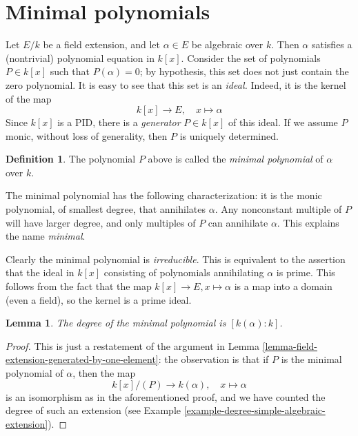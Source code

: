 \documentclass{stacks-project}
\theoremstyle{plain}
\newtheorem{lemma}[subsection]{Lemma}
\theoremstyle{definition}
\newtheorem{definition}[subsection]{Definition}
\theoremstyle{remark}
\numberwithin{equation}{subsection}
\begin{document}
\section{Minimal polynomials}
\label{section-minimal-polynomials}

\noindent
Let $E/k$ be a field extension, and let $\alpha \in E$ be algebraic over $k$.
Then $\alpha$ satisfies a (nontrivial) polynomial equation in $k[x]$.
Consider the set of polynomials $P \in k[x]$ such that $P(\alpha) = 0$; by
hypothesis, this set does not just contain the zero polynomial.
It is easy to see that this set is an {\it ideal.} Indeed, it is the kernel
of the map
$$
k[x] \to E, \quad x \mapsto \alpha
$$
Since $k[x]$ is a PID, there is a {\it generator} $P \in k[x]$ of this
ideal. If we assume $P$ monic, without loss of generality, then $P$ is
uniquely determined.

\begin{definition}
\label{definition-minimal-polynomial}
The polynomial $P$ above is called the {\it minimal polynomial}
of $\alpha$ over $k$.
\end{definition}

\noindent
The minimal polynomial has the following characterization: it is the monic
polynomial, of smallest degree, that annihilates $\alpha$. Any nonconstant
multiple of $P$ will have larger degree, and only multiples of $P$ can
annihilate $\alpha$. This explains the name {\it minimal}.

\medskip\noindent
Clearly the minimal polynomial is {\it irreducible}. This is equivalent to the
assertion that the ideal in $k[x]$ consisting of polynomials annihilating
$\alpha$ is prime. This follows from the fact that the map
$k[x] \to E, x \mapsto \alpha$ is a map into a domain (even a field), so the
kernel is a prime ideal.

\begin{lemma}
\label{lemma-degree-minimal-polynomial}
The degree of the minimal polynomial is $[k(\alpha) : k]$.
\end{lemma}

\begin{proof}
This is just a restatement of the argument in
Lemma \ref{lemma-field-extension-generated-by-one-element}: the observation
is that if $P$ is the minimal polynomial of $\alpha$, then the map
$$
k[x]/(P) \to k(\alpha), \quad x \mapsto \alpha
$$
is an isomorphism as in the aforementioned proof, and we have counted the
degree of such an extension (see
Example \ref{example-degree-simple-algebraic-extension}).
\end{proof}
\end{document}
